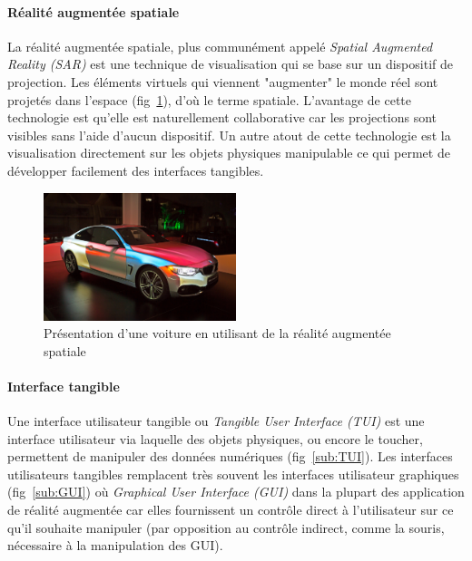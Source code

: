\paragraph{Réalité augmentée spatiale}
La réalité augmentée spatiale, plus communément appelé \emph{Spatial Augmented Reality (SAR)} est une technique de visualisation qui se base sur un dispositif de projection. Les éléments virtuels qui viennent "augmenter" le monde réel sont projetés dans l'espace (fig~\ref{fig:SAR}), d'où le terme spatiale. L'avantage de cette technologie est qu'elle est naturellement collaborative car les projections sont visibles sans l'aide d'aucun dispositif. Un autre atout de cette technologie est la visualisation directement sur les objets physiques manipulable ce qui permet de développer facilement des interfaces tangibles.

\begin{figure}[H]
\centering
\includegraphics[width=0.5\textwidth]{images/SARMappingCar2}
\caption{Présentation d'une voiture en utilisant de la réalité augmentée spatiale\protect\footnotemark}
\label{fig:SAR}
\end{figure}

\paragraph{Interface tangible}
Une interface utilisateur tangible ou \emph{Tangible User Interface (TUI)} est une interface utilisateur via laquelle des objets physiques, ou encore le toucher, permettent de manipuler des données numériques (fig~\ref{sub:TUI}). Les interfaces utilisateurs tangibles remplacent très souvent les interfaces utilisateur graphiques (fig~\ref{sub:GUI}) où \emph{Graphical User Interface (GUI)} dans la plupart des application de réalité augmentée car elles fournissent un contrôle direct à l'utilisateur sur ce qu'il souhaite manipuler (par opposition au contrôle indirect, comme la souris, nécessaire à la manipulation des GUI).

